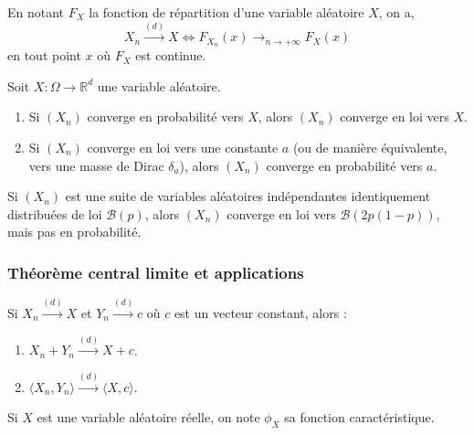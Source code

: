 
  \begin{theorem}
    En notant $F_X$ la fonction de répartition d'une variable aléatoire $X$, on a,
    \[ X_n \overset{(d)}{\longrightarrow} X \iff F_{X_n}(x) \longrightarrow_{n \rightarrow +\infty} F_X(x) \]
    en tout point $x$ où $F_X$ est continue.
  \end{theorem}

  \begin{theorem}
    Soit $X : \Omega \rightarrow \mathbb{R}^d$ une variable aléatoire.
    \begin{enumerate}[label=(\roman*)]
      \item Si $(X_n)$ converge en probabilité vers $X$, alors $(X_n)$ converge en loi vers $X$.
      \item Si $(X_n)$ converge en loi vers une constante $a$ (ou de manière équivalente, vers une masse de Dirac $\delta_a$), alors $(X_n)$ converge en probabilité vers $a$.
    \end{enumerate}
  \end{theorem}


  \begin{cexample}
    Si $(X_n)$ est une suite de variables aléatoires indépendantes identiquement distribuées de loi $\mathcal{B}(p)$, alors $(X_n)$ converge en loi vers $\mathcal{B}(2p(1-p))$, mais pas en probabilité.
  \end{cexample}

  \subsubsection{Théorème central limite et applications}


  \begin{theorem}[Slutsky]
    Si $X_n \overset{(d)}{\longrightarrow} X$ et $Y_n \overset{(d)}{\longrightarrow} c$ où $c$ est un vecteur constant, alors :
    \begin{enumerate}[label=(\roman*)]
      \item $X_n + Y_n \overset{(d)}{\longrightarrow} X + c$.
      \item $\langle X_n, Y_n \rangle \overset{(d)}{\longrightarrow} \langle X, c \rangle$.
    \end{enumerate}
  \end{theorem}

  \begin{notation}
    Si $X$ est une variable aléatoire réelle, on note $\phi_X$ sa fonction caractéristique.
  \end{notation}

